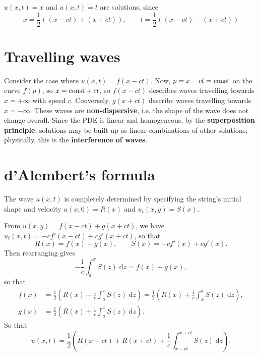 \documentclass[letter-paper]{tufte-book}
\newenvironment{example}[1][Example]{\begin{trivlist}
\item[\hskip \labelsep {\bfseries #1}]}{\end{trivlist}}
\newcommand\Def[1]{\textbf{#1}}
\begin{document}
\begin{example}
  $u(x,t) = x$ and $u(x,t) = t$ are solutions, since
  \begin{equation*}
    x = \frac{1}{2}\left((x-ct) + (x+ct)\right), \qquad
    t = \frac{1}{2}\left((x-ct) - (x+ct)\right)
  \end{equation*}
\end{example}


\section{Travelling waves}

Consider the case where $u(x,t) = f(x - ct)$. Now, $p = x - ct =
\textnormal{const}$ on the curve $f(p)$, so $x = \textnormal{const} + ct$, so
$f(x - ct)$ describes waves travelling towards $x = +\infty$ with speed $c$.
Conversely, $g(x + ct)$ describe waves travelling towards $x=-\infty$. These
waves are \Def{non-dispersive}, i.e. the shape of the wave does not change
overall. Since the PDE is linear and homogeneous, by the
\Def{superposition principle}, solutions may be built up as linear
combinations of other solutions; physically, this is the \Def{interference
of waves}.


\section{d'Alembert's formula}

The wave $u(x,t)$ is completely determined by specifying the string's initial
shape and velocity $u(x, 0) = R(x)$ and $u_t (x,y) = S(x)$.

From $u(x,y) = f(x-ct) + g(x+ct)$, we have $u_t (x,t)= -cf'(x-ct) + cg'(x+ct)$,
so that
\begin{equation*}
  R(x) = f(x) + g(x), \qquad S(x) = -cf'(x) + cg'(x).
\end{equation*}
Then rearranging gives
\begin{equation*}
  -\frac{1}{c}\int_a^x S(z)\; \mathrm{d}z = f(x) - g(x),
\end{equation*}
so that
\begin{align*}
  f(x) &= \frac{1}{2}\left( R(x) - \frac{1}{c} \int_a^x S(z)\; \mathrm{d}z\right) 
       = \frac{1}{2}\left( R(x) + \frac{1}{c} \int_x^a S(z)\; \mathrm{d}z\right),\\
  g(x) &= \frac{1}{2}\left( R(x) + \frac{1}{c} \int_a^x S(z)\; \mathrm{d}z\right).
\end{align*}
So that
\begin{equation*}
  u(x,t) = \frac{1}{2}\left(R(x-ct) + R(x+ct) + \frac{1}{c} \int_{x-ct}^{x+ct} S(z)\; \mathrm{d}z\right).
\end{equation*}
\end{document}

